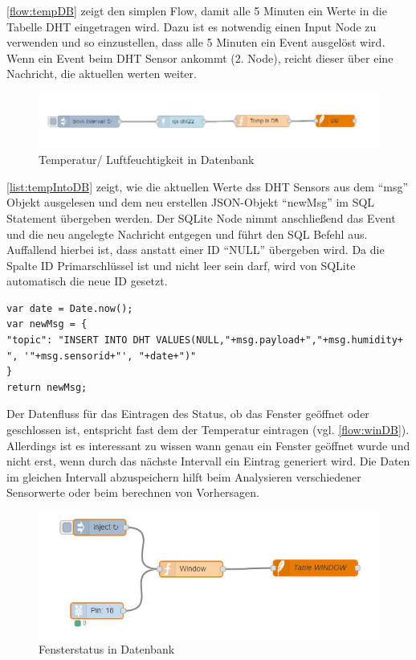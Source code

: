 \autoref{flow:tempDB} zeigt den simplen Flow, damit alle 5 Minuten ein Werte in die Tabelle DHT eingetragen wird. Dazu ist es notwendig einen Input Node zu verwenden und so einzustellen, dass alle 5 Minuten ein Event ausgelöst wird. Wenn ein Event beim DHT Sensor ankommt (2. Node), reicht dieser über eine Nachricht, die aktuellen werten weiter. 
\begin{figure}[h]
	\centering
	\includegraphics[scale=0.7]{images/tempIntoDB}
	\caption{Temperatur/ Luftfeuchtigkeit in Datenbank}
	\label{flow:tempDB}
\end{figure}
\autoref{list:tempIntoDB} zeigt, wie die aktuellen Werte dss DHT Sensors aus dem \enquote{msg} Objekt ausgelesen und dem neu erstellen \ac{JSON}-Objekt \enquote{newMsg} im \ac{SQL} Statement übergeben werden. Der SQLite Node nimmt anschließend das Event und die neu angelegte Nachricht entgegen und führt den \ac{SQL} Befehl  aus. Auffallend hierbei ist, dass anstatt einer ID \enquote{NULL} übergeben wird. Da die Spalte ID Primarschlüssel ist und nicht leer sein darf, wird von SQLite automatisch die neue ID gesetzt.
\begin{lstlisting}[label=list:tempIntoDB, caption={Neuer Eintrag in Tabelle DHT}]
var date = Date.now();
var newMsg = {
"topic": "INSERT INTO DHT VALUES(NULL,"+msg.payload+","+msg.humidity+ ", '"+msg.sensorid+"', "+date+")"
}
return newMsg;
\end{lstlisting}
Der Datenfluss für das Eintragen des Status, ob das Fenster geöffnet oder geschlossen ist, entspricht fast dem der Temperatur eintragen (vgl. \autoref{flow:winDB}). Allerdings ist es interessant zu wissen wann genau ein Fenster geöffnet wurde und nicht erst, wenn durch das nächste Intervall ein Eintrag generiert wird. Die Daten im gleichen Intervall abzuspeichern hilft beim Analysieren verschiedener Sensorwerte oder beim berechnen von Vorhersagen. 
\begin{figure}[h]
	\centering
	\includegraphics[scale=0.7]{images/windowIntoDB}
	\caption{Fensterstatus in Datenbank}
	\label{flow:winDB}
\end{figure}

